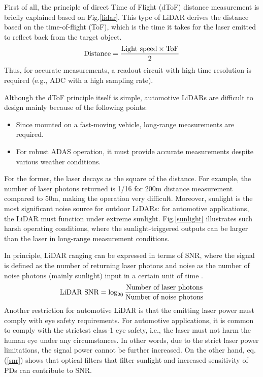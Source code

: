 \documentclass[paper]{ieice}
\begin{document}
\qquad First of all, the principle of direct Time of Flight (dToF) distance measurement is briefly explained based on Fig.\ref{lidar}. This type of LiDAR derives the distance based on the time-of-flight  (ToF), which is the time it takes for the laser emitted to reflect back from the target object.
\begin{eqnarray}
    \centering
    \textrm{Distance} = \frac{\textrm{Light speed} \times \textrm{ToF}}{2}
    \label{dist}
\end{eqnarray}
Thus, for accurate measurements, a readout circuit with high time resolution is required (e.g., ADC with a high sampling rate).

Although the dToF principle itself is simple, automotive LiDARs are difficult to design mainly because of the following points: 
\begin{itemize}
\item Since mounted on a fast-moving vehicle, long-range measurements are required.
\item For robust ADAS operation, it must provide accurate measurements despite various weather conditions.
\end{itemize}
For the former, the laser decays as the square of the distance. For example, the number of laser photons returned is 1/16 for 200m distance measurement compared to 50m, making the operation very difficult. Moreover, sunlight is the most significant noise source for outdoor LiDARs: for automotive applications, the LiDAR must function under extreme sunlight. Fig.\ref{sunlight} illustrates such harsh operating conditions, where the sunlight-triggered outputs can be larger than the laser in long-range measurement conditions.

In principle, LiDAR ranging can be expressed in terms of SNR, where the signal is defined as the number of returning laser photons and noise as the number of noise photons (mainly sunlight) input in a certain unit of time \cite{yoshioka201820}.
\begin{eqnarray}
    \centering
    \textrm{LiDAR SNR} = \log_{20}{\frac{\textrm{Number of laser photons}}{\textrm{Number of noise photons}}}
    \label{snr}
\end{eqnarray}
Another restriction for automotive LiDAR is that the emitting laser power must comply with eye safety requirements. For automotive applications, it is common to comply with the strictest class-1 eye safety, i.e., the laser must not harm the human eye under any circumstances. In other words, due to the strict laser power limitations, the signal power cannot be further increased. On the other hand, eq.(\ref{snr}) shows that optical filters that filter sunlight and increased sensitivity of PDs can contribute to SNR.
\end{document}
